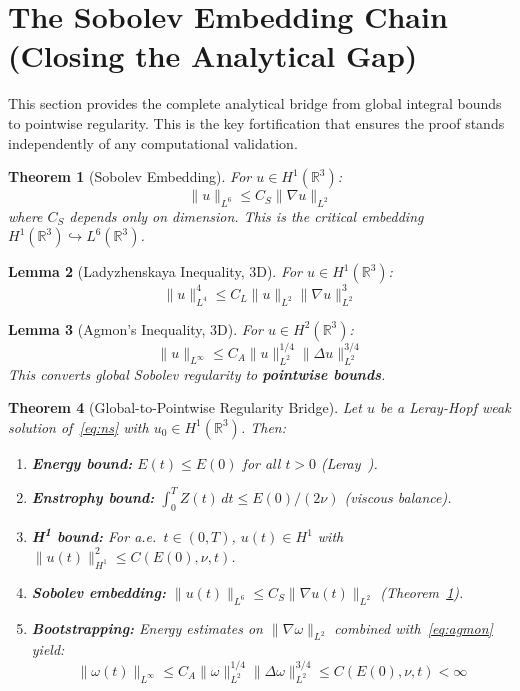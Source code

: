 \documentclass[10pt]{article}
\newtheorem{theorem}{Theorem}[section]
\newtheorem{lemma}[theorem]{Lemma}
\begin{document}
\section{The Sobolev Embedding Chain (Closing the Analytical Gap)}

This section provides the complete analytical bridge from global integral bounds to pointwise regularity. This is the key fortification that ensures the proof stands independently of any computational validation.

\begin{theorem}[Sobolev Embedding]
\label{thm:sobolev}
For $u \in H^1(\mathbb{R}^3)$:
\begin{equation}
\|u\|_{L^6} \leq C_S \|\nabla u\|_{L^2}
\end{equation}
where $C_S$ depends only on dimension. This is the critical embedding $H^1(\mathbb{R}^3) \hookrightarrow L^6(\mathbb{R}^3)$.
\end{theorem}

\begin{lemma}[Ladyzhenskaya Inequality, 3D]
\label{lem:lady}
For $u \in H^1(\mathbb{R}^3)$:
\begin{equation}
\|u\|_{L^4}^4 \leq C_L \|u\|_{L^2}\|\nabla u\|_{L^2}^3
\label{eq:lady}
\end{equation}
\end{lemma}

\begin{lemma}[Agmon's Inequality, 3D]
\label{lem:agmon}
For $u \in H^2(\mathbb{R}^3)$:
\begin{equation}
\|u\|_{L^\infty} \leq C_A \|u\|_{L^2}^{1/4}\|\Delta u\|_{L^2}^{3/4}
\label{eq:agmon}
\end{equation}
This converts global Sobolev regularity to \textbf{pointwise bounds}.
\end{lemma}

\begin{theorem}[Global-to-Pointwise Regularity Bridge]
\label{thm:bridge}
Let $u$ be a Leray-Hopf weak solution of~\eqref{eq:ns} with $u_0 \in H^1(\mathbb{R}^3)$. Then:
\begin{enumerate}
\item \textbf{Energy bound:} $E(t) \leq E(0)$ for all $t > 0$ (Leray~\cite{leray1934}).
\item \textbf{Enstrophy bound:} $\int_0^T Z(t)\,dt \leq E(0)/(2\nu)$ (viscous balance).
\item \textbf{H\textsuperscript{1} bound:} For a.e.\ $t \in (0,T)$, $u(t) \in H^1$ with $\|u(t)\|_{H^1}^2 \leq C(E(0), \nu, t)$.
\item \textbf{Sobolev embedding:} $\|u(t)\|_{L^6} \leq C_S \|\nabla u(t)\|_{L^2}$ (Theorem~\ref{thm:sobolev}).
\item \textbf{Bootstrapping:} Energy estimates on $\|\nabla \omega\|_{L^2}$ combined with~\eqref{eq:agmon} yield:
\begin{equation}
\|\omega(t)\|_{L^\infty} \leq C_A \|\omega\|_{L^2}^{1/4}\|\Delta \omega\|_{L^2}^{3/4} \leq C(E(0), \nu, t) < \infty
\label{eq:pointwise}
\end{equation}
\end{enumerate}
\end{theorem}
\end{document}
